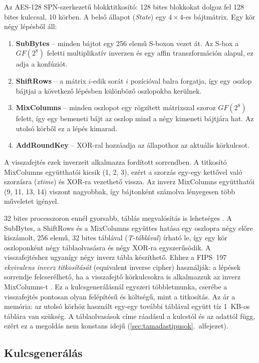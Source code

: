 \documentclass[a4paper,12pt]{report}
\theoremstyle{definition}
\theoremstyle{remark}
\begin{document}
Az AES-128 SPN-szerkezetű blokktitkosító: 128 bites blokkokat dolgoz fel 128 bites kulccsal, 10 körben. A belső állapot (\emph{State}) egy $4 \times 4$-es bájtmátrix. Egy kör négy lépésből áll:

\begin{enumerate}
	\item \textbf{SubBytes} -- minden bájtot egy 256 elemű S-boxon vezet át. Az S-box a $GF(2^8)$ feletti multiplikatív inverzen és egy affin transzformáción alapul, ez adja a konfúziót.
	\item \textbf{ShiftRows} -- a mátrix $i$-edik sorát $i$ pozícióval balra forgatja, így egy oszlop bájtjai a következő lépésben különböző oszlopokba kerülnek.
	\item \textbf{MixColumns} -- minden oszlopot egy rögzített mátrixszal szoroz $GF(2^8)$ felett, így egy bemeneti bájt az oszlop mind a négy kimeneti bájtjára hat. Az utolsó körből ez a lépés kimarad.
	\item \textbf{AddRoundKey} -- XOR-ral hozzáadja az állapothoz az aktuális körkulcsot.
\end{enumerate}

A visszafejtés ezek inverzeit alkalmazza fordított sorrendben. A titkosító MixColumns együtthatói kicsik (1, 2, 3), ezért a szorzás egy-egy kettővel való szorzásra (\emph{xtime}) és XOR-ra vezethető vissza. Az inverz MixColumns együtthatói (9, 11, 13, 14) viszont nagyobbak, így bájtonként számolva lényegesen több műveletet igényel.

32 bites processzoron ennél gyorsabb, táblás megvalósítás is lehetséges \cite{DaemenRijmen2002}. A SubBytes, a ShiftRows és a MixColumns együttes hatása egy oszlopra négy előre kiszámolt, 256 elemű, 32 bites táblával (\emph{T-táblával}) írható le, így egy kör oszloponként négy táblaolvasásra és négy XOR-ra egyszerűsödik. A visszafejtéshez ugyanígy négy inverz tábla készíthető. Ehhez a FIPS~197 \emph{ekvivalens inverz titkosítását} (equivalent inverse cipher) használják: a lépések sorrendje felcserélhető, ha a visszafejtő körkulcsokra is alkalmazzuk az inverz MixColumns-t \cite{FIPS197}. Ez a kulcsgenerálásnál egyszeri többletmunka, cserébe a visszafejtés pontosan olyan felépítésű és költségű, mint a titkosítás. Az ár a memória: az utolsó körhöz használt egy-egy további táblával együtt tíz 1~KB-os táblára van szükség. A táblaolvasások címe ráadásul a kulcstól és az adattól függ, ezért ez a megoldás nem konstans idejű (\ref{sec:tamadastipusok}.~alfejezet).

\subsection{Kulcsgenerálás}\label{sec:aes_kulcs}
\end{document}
